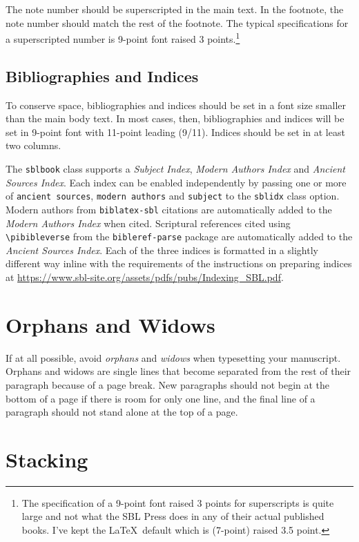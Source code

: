 \documentclass[sblidx={ancient sources, modern authors, subject}]{sblbook}
\begin{document}
The note number should be superscripted in the main text. In the footnote, the
note number should match the rest of the footnote. The typical specifications
for a superscripted number is 9-point font raised 3
points.\footnote{The specification of a 9-point font raised 3 points for
superscripts is quite large and not what the SBL Press does in any of their
actual published books. I've kept the \LaTeX\ default which is
\texttt{\string\scriptsize} (7-point) raised 3.5 point.}

\subsection{Bibliographies and Indices}

To conserve space, bibliographies and indices should be set in a font size
smaller than the main body text. In most cases, then, bibliographies and
indices will be set in 9-point font with 11-point leading (9/11). Indices
should be set in at least two columns.

The \texttt{sblbook} class supports a \emph{Subject Index}, \emph{Modern
Authors Index} and \emph{Ancient Sources Index}. Each index can be enabled
independently by passing one or more of \texttt{ancient sources},
\texttt{modern authors} and \texttt{subject} to the \texttt{sblidx} class
option. Modern authors from \texttt{biblatex-sbl} citations are automatically
added to the \emph{Modern Authors Index} when cited. Scriptural references
cited using \verb|\pibibleverse| from the \texttt{bibleref-parse} package are
automatically added to the \emph{Ancient Sources Index}. Each of the three
indices is formatted in a slightly different way inline with the requirements
of the instructions on preparing indices at
\url{https://www.sbl-site.org/assets/pdfs/pubs/Indexing_SBL.pdf}.

\section{Orphans and Widows}

If at all possible, avoid \emph{orphans} and
\emph{widows} when typesetting your manuscript. Orphans and
widows are single lines that become separated from the rest of their paragraph
because of a page break. New paragraphs should not begin at the bottom of a
page if there is room for only one line, and the final line of a paragraph
should not stand alone at the top of a page.

\section{Stacking}
\end{document}
